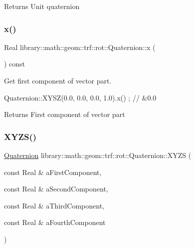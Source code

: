 \begin{DoxyReturn}{Returns}
Unit quaternion 
\end{DoxyReturn}
\mbox{\label{classlibrary_1_1math_1_1geom_1_1trf_1_1rot_1_1_quaternion_abd664a9792b2e039a980e77b861f74dd}} 
\subsubsection{\texorpdfstring{x()}{x()}}
{\footnotesize\ttfamily Real library\+::math\+::geom\+::trf\+::rot\+::\+Quaternion\+::x (\begin{DoxyParamCaption}{ }\end{DoxyParamCaption}) const}



Get first component of vector part. 


\begin{DoxyCode}
Quaternion::XYSZ(0.0, 0.0, 0.0, 1.0).x() ; \textcolor{comment}{// &0.0}
\end{DoxyCode}


\begin{DoxyReturn}{Returns}
First component of vector part 
\end{DoxyReturn}
\mbox{\label{classlibrary_1_1math_1_1geom_1_1trf_1_1rot_1_1_quaternion_afff9523c7dcbfbbc521736121e62ad41}} 
\subsubsection{\texorpdfstring{X\+Y\+Z\+S()}{XYZS()}}
{\footnotesize\ttfamily \hyperlink{classlibrary_1_1math_1_1geom_1_1trf_1_1rot_1_1_quaternion}{Quaternion} library\+::math\+::geom\+::trf\+::rot\+::\+Quaternion\+::\+X\+Y\+ZS (\begin{DoxyParamCaption}\item[{const Real \&}]{a\+First\+Component,  }\item[{const Real \&}]{a\+Second\+Component,  }\item[{const Real \&}]{a\+Third\+Component,  }\item[{const Real \&}]{a\+Fourth\+Component }\end{DoxyParamCaption})\hspace{0.3cm}{\ttfamily [static]}}



